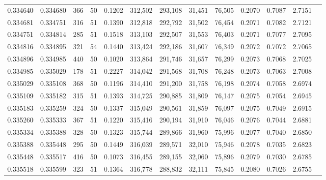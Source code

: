 \begin{tabular}{rrrrrrrrrrrrr}
0.334640 & 0.334680 &   366 &  50 &                                     0.1202 & 312,502 & 293,108 &  31,451 &  76,505 & 0.2070 & 0.7087 & 2.7151 \\
0.334681 & 0.334751 &   316 &  51 &                                     0.1390 & 312,818 & 292,792 &  31,502 &  76,454 & 0.2071 & 0.7082 & 2.7121 \\
0.334751 & 0.334814 &   285 &  51 &                                     0.1518 & 313,103 & 292,507 &  31,553 &  76,403 & 0.2071 & 0.7077 & 2.7095 \\
0.334816 & 0.334895 &   321 &  54 &                                     0.1440 & 313,424 & 292,186 &  31,607 &  76,349 & 0.2072 & 0.7072 & 2.7065 \\
0.334896 & 0.334985 &   440 &  50 &                                     0.1020 & 313,864 & 291,746 &  31,657 &  76,299 & 0.2073 & 0.7068 & 2.7025 \\
0.334985 & 0.335029 &   178 &  51 &                                     0.2227 & 314,042 & 291,568 &  31,708 &  76,248 & 0.2073 & 0.7063 & 2.7008 \\
0.335029 & 0.335108 &   368 &  50 &                                     0.1196 & 314,410 & 291,200 &  31,758 &  76,198 & 0.2074 & 0.7058 & 2.6974 \\
0.335109 & 0.335182 &   315 &  51 &                                     0.1393 & 314,725 & 290,885 &  31,809 &  76,147 & 0.2075 & 0.7054 & 2.6945 \\
0.335183 & 0.335259 &   324 &  50 &                                     0.1337 & 315,049 & 290,561 &  31,859 &  76,097 & 0.2075 & 0.7049 & 2.6915 \\
0.335260 & 0.335333 &   367 &  51 &                                     0.1220 & 315,416 & 290,194 &  31,910 &  76,046 & 0.2076 & 0.7044 & 2.6881 \\
0.335334 & 0.335388 &   328 &  50 &                                     0.1323 & 315,744 & 289,866 &  31,960 &  75,996 & 0.2077 & 0.7040 & 2.6850 \\
0.335388 & 0.335448 &   295 &  50 &                                     0.1449 & 316,039 & 289,571 &  32,010 &  75,946 & 0.2078 & 0.7035 & 2.6823 \\
0.335448 & 0.335517 &   416 &  50 &                                     0.1073 & 316,455 & 289,155 &  32,060 &  75,896 & 0.2079 & 0.7030 & 2.6785 \\
0.335518 & 0.335599 &   323 &  51 &                                     0.1364 & 316,778 & 288,832 &  32,111 &  75,845 & 0.2080 & 0.7026 & 2.6755 \\

\end{tabular}
